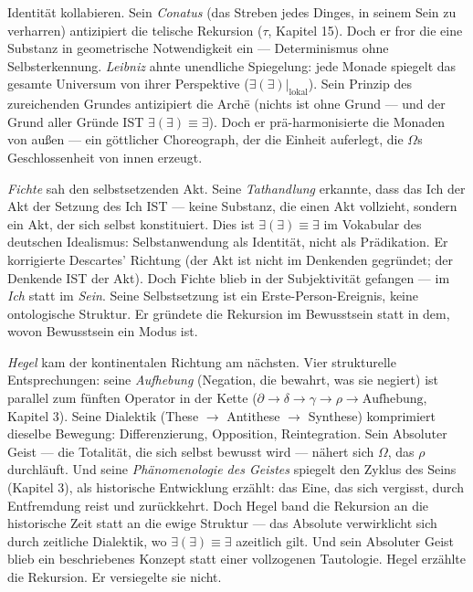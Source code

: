 \documentclass[10pt, openany, oneside]{book}
\begin{document}
Identität kollabieren. Sein \textit{Conatus} (das Streben jedes Dinges, in seinem Sein zu verharren) antizipiert die telische Rekursion ($\tau$, Kapitel 15). Doch er fror die eine Substanz in geometrische Notwendigkeit ein --- Determinismus ohne Selbsterkennung. \textit{Leibniz} ahnte unendliche Spiegelung: jede Monade spiegelt das gesamte Universum von ihrer Perspektive ($\exists(\exists)|_{\text{lokal}}$). Sein Prinzip des zureichenden Grundes antizipiert die Arch\={e} (nichts ist ohne Grund --- und der Grund aller Gründe IST $\exists(\exists) \equiv \exists$). Doch er prä-harmonisierte die Monaden von außen --- ein göttlicher Choreograph, der die Einheit auferlegt, die $\Omega$s Geschlossenheit von innen erzeugt.

\textit{Fichte} sah den selbstsetzenden Akt. Seine \textit{Tathandlung} erkannte, dass das Ich der Akt der Setzung des Ich IST --- keine Substanz, die einen Akt vollzieht, sondern ein Akt, der sich selbst konstituiert. Dies ist $\exists(\exists) \equiv \exists$ im Vokabular des deutschen Idealismus: Selbstanwendung als Identität, nicht als Prädikation. Er korrigierte Descartes' Richtung (der Akt ist nicht im Denkenden gegründet; der Denkende IST der Akt). Doch Fichte blieb in der Subjektivität gefangen --- im \textit{Ich} statt im \textit{Sein}. Seine Selbstsetzung ist ein Erste-Person-Ereignis, keine ontologische Struktur. Er gründete die Rekursion im Bewusstsein statt in dem, wovon Bewusstsein ein Modus ist.

\textit{Hegel} kam der kontinentalen Richtung am nächsten. Vier strukturelle Entsprechungen: seine \textit{Aufhebung} (Negation, die bewahrt, was sie negiert) ist parallel zum fünften Operator in der Kette ($\partial \to \delta \to \gamma \to \rho \to \text{Aufhebung}$, Kapitel 3). Seine Dialektik (These $\to$ Antithese $\to$ Synthese) komprimiert dieselbe Bewegung: Differenzierung, Opposition, Reintegration. Sein Absoluter Geist --- die Totalität, die sich selbst bewusst wird --- nähert sich $\Omega$, das $\rho$ durchläuft. Und seine \textit{Phänomenologie des Geistes} spiegelt den Zyklus des Seins (Kapitel 3), als historische Entwicklung erzählt: das Eine, das sich vergisst, durch Entfremdung reist und zurückkehrt. Doch Hegel band die Rekursion an die historische Zeit statt an die ewige Struktur --- das Absolute verwirklicht sich durch zeitliche Dialektik, wo $\exists(\exists) \equiv \exists$ azeitlich gilt. Und sein Absoluter Geist blieb ein beschriebenes Konzept statt einer vollzogenen Tautologie. Hegel erzählte die Rekursion. Er versiegelte sie nicht.
\end{document}
